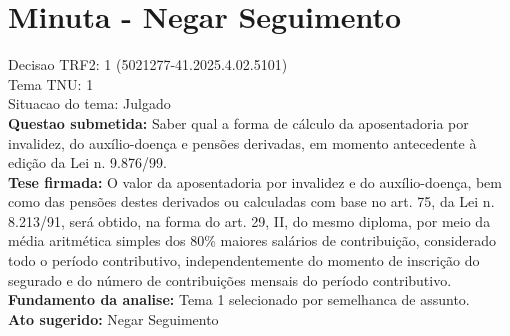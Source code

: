 \documentclass{article}
\begin{document}
\section*{Minuta - Negar Seguimento}
Decisao TRF2: 1 (5021277-41.2025.4.02.5101)\\
Tema TNU: 1\\
Situacao do tema: Julgado\\
\textbf{Questao submetida:} Saber qual a forma de cálculo da aposentadoria por invalidez, do auxílio-doença e pensões derivadas, em momento antecedente à edição da Lei n. 9.876/99.\\
\textbf{Tese firmada:} O valor da aposentadoria por invalidez e do auxílio-doença, bem como das pensões destes derivados ou calculadas com base no art. 75, da Lei n. 8.213/91, será obtido, na forma do art. 29, II, do mesmo diploma, por meio da média aritmética simples dos 80\% maiores salários de contribuição, considerado todo o período contributivo, independentemente do momento de inscrição do segurado e do número de contribuições mensais do período contributivo.\\
\textbf{Fundamento da analise:} Tema 1 selecionado por semelhanca de assunto.\\
\textbf{Ato sugerido:} Negar Seguimento
\end{document}
